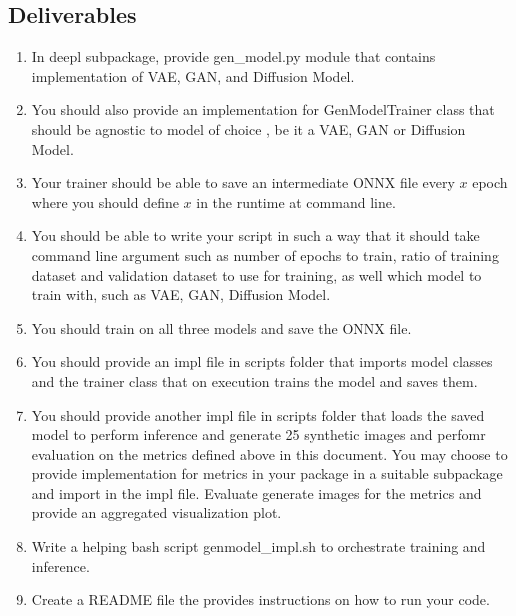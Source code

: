 \documentclass[12pt, xcolor=dvipsnames,svgnames,x11names]{article}
\theoremstyle{definition}
\begin{document}
\subsection{Deliverables}

\begin{enumerate}
\item In deepl subpackage, provide gen\_model.py module that contains implementation of VAE, GAN, and Diffusion Model.

\item You should also provide an implementation for GenModelTrainer class that should be agnostic to model of choice , be it a VAE, GAN or Diffusion Model.

\item Your trainer should be able to save an intermediate ONNX file every $x$ epoch where you should define $x$ in the runtime at command line.

\item You should be able to write your script in such a way that it should take command line argument such as number of epochs to train, ratio of training dataset and validation dataset to use for training, as well which model to train with, such as VAE, GAN, Diffusion Model.

\item You should train on all three models and save the ONNX file.

\item You should provide an impl file in scripts folder that imports model classes and the trainer class that on execution trains the model and saves them.

\item You should provide another impl file in scripts folder that loads the saved model to perform inference and generate 25 synthetic images and perfomr evaluation on the metrics defined above in this document. You may choose to provide implementation for metrics in your package in a suitable subpackage and import in the impl file. Evaluate generate images for the metrics and provide an aggregated visualization plot.

\item Write a helping bash script genmodel\_impl.sh to orchestrate training and inference.

\item Create a README file the provides instructions on how to run your code.
\end{enumerate}
\end{document}
